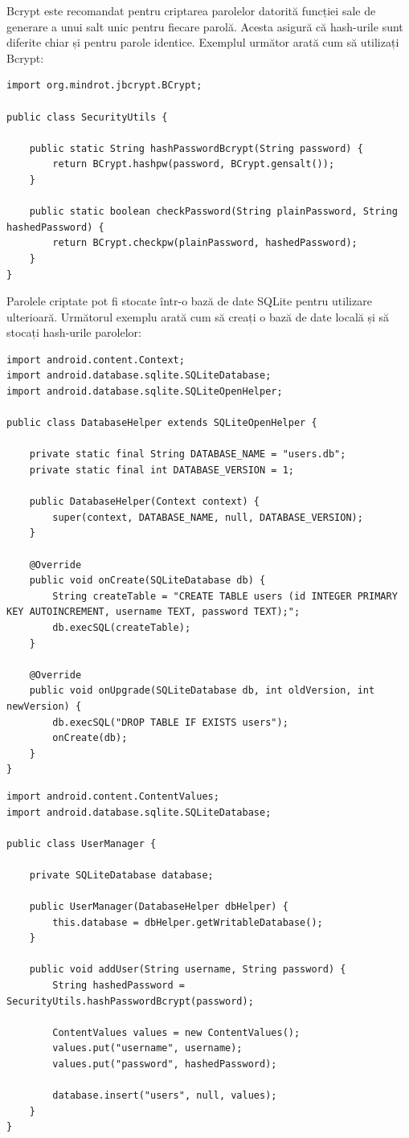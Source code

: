 \documentclass[runningheads]{llncs}
\begin{document}
Bcrypt este recomandat pentru criptarea parolelor datorită funcției sale de generare a unui salt unic pentru fiecare parolă. Acesta asigură că hash-urile sunt diferite chiar și pentru parole identice. Exemplul următor arată cum să utilizați Bcrypt:

\begin{lstlisting}
import org.mindrot.jbcrypt.BCrypt;

public class SecurityUtils {

    public static String hashPasswordBcrypt(String password) {
        return BCrypt.hashpw(password, BCrypt.gensalt());
    }

    public static boolean checkPassword(String plainPassword, String hashedPassword) {
        return BCrypt.checkpw(plainPassword, hashedPassword);
    }
}
\end{lstlisting}

Parolele criptate pot fi stocate într-o bază de date SQLite pentru utilizare ulterioară. Următorul exemplu arată cum să creați o bază de date locală și să stocați hash-urile parolelor:

\begin{lstlisting}
import android.content.Context;
import android.database.sqlite.SQLiteDatabase;
import android.database.sqlite.SQLiteOpenHelper;

public class DatabaseHelper extends SQLiteOpenHelper {

    private static final String DATABASE_NAME = "users.db";
    private static final int DATABASE_VERSION = 1;

    public DatabaseHelper(Context context) {
        super(context, DATABASE_NAME, null, DATABASE_VERSION);
    }

    @Override
    public void onCreate(SQLiteDatabase db) {
        String createTable = "CREATE TABLE users (id INTEGER PRIMARY KEY AUTOINCREMENT, username TEXT, password TEXT);";
        db.execSQL(createTable);
    }

    @Override
    public void onUpgrade(SQLiteDatabase db, int oldVersion, int newVersion) {
        db.execSQL("DROP TABLE IF EXISTS users");
        onCreate(db);
    }
}
\end{lstlisting}

\begin{lstlisting}
import android.content.ContentValues;
import android.database.sqlite.SQLiteDatabase;

public class UserManager {

    private SQLiteDatabase database;

    public UserManager(DatabaseHelper dbHelper) {
        this.database = dbHelper.getWritableDatabase();
    }

    public void addUser(String username, String password) {
        String hashedPassword = SecurityUtils.hashPasswordBcrypt(password);

        ContentValues values = new ContentValues();
        values.put("username", username);
        values.put("password", hashedPassword);

        database.insert("users", null, values);
    }
}
\end{lstlisting}
\end{document}
